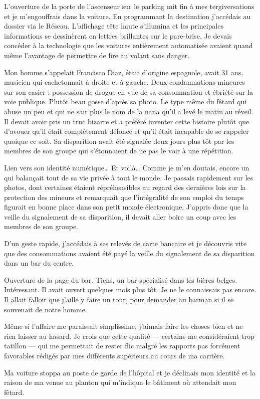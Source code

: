 L'ouverture de la porte de l'ascenseur sur le parking mit fin à mes
tergiversations et je m'engouffrais dans la voiture. En programmant la
destination j'accédais au dossier via le Réseau. L'affichage tête haute
s'illumina et les principales informations se dessinèrent en lettres brillantes
sur le pare-brise. Je devais concéder à la technologie que les voitures
entièrement automatisée avaient quand même l'avantage de permettre de lire au
volant sans danger.

Mon homme s'appelait Francisco Diaz, était d'origine espagnole, avait 31 ans,
musicien qui cachetonnait à droite et à gauche. Deux condamnations mineures sur
son casier : possession de drogue en vue de sa consommation et ébriété sur la
voie publique. Plutôt beau gosse d'après sa photo. Le type même du fêtard qui
abuse un peu et qui ne sait plus le nom de la nana qu'il a levé le matin au
réveil. Il devait avoir pris un truc bizarre et a préféré inventer cette
histoire plutôt que d'avouer qu'il était complètement défoncé et qu'il était
incapable de se rappeler quoique ce soit. Sa disparition avait été signalée
deux jours plus tôt par les membres de son groupe qui s'étonnaient de ne pas le
voir à une répétition.

Lien vers son identité numérique… Et voilà… Comme je m'en doutais, encore un
qui balançait tout de sa vie privée à tout le monde. Je passais rapidement sur
les photos, dont certaines étaient répréhensibles au regard des dernières lois
sur la protection des mineurs et remarquait que l'intégralité de son emploi du
temps figurait en bonne place dans son petit monde électronique. J'appris donc
que la veille du signalement de sa disparition, il devait aller boire un coup
avec les membres de son groupe.

D'un geste rapide, j'accédais à ses relevés de carte bancaire et je découvris
vite que des consommations avaient été payé la veille du signalement de sa
disparition dans un bar du centre.

Ouverture de la page du bar. Tiens, un bar spécialisé dans les bières belges.
Intéressant. Il avait ouvert quelques mois plus tôt. Je ne le connaissais pas
encore. Il allait falloir que j'aille y faire un tour, pour demander au barman
si il se souvenait de notre homme.

Même si l'affaire me paraissait simplissime, j'aimais faire les choses bien et
ne rien laisser au hasard. Je crois que cette qualité — certains me
considéraient trop tatillon — qui me permettait de rester flic malgré les
rapports pas forcément favorables rédigés par mes différents supérieurs au
cours de ma carrière.

Ma voiture stoppa au poste de garde de l'hôpital et je déclinais mon identité
et la raison de ma venue au planton qui m'indiqua le bâtiment où attendait mon
fêtard.